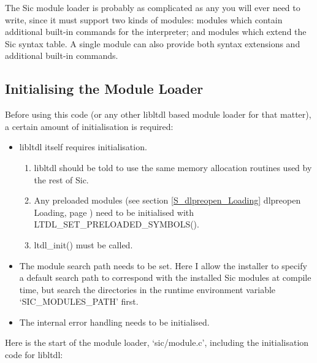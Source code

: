 The Sic module loader is probably as complicated as any you will ever need to write, since it must support two kinds of modules: modules which contain additional built-in commands for the interpreter; and modules which extend the Sic syntax table. A single module can also provide both syntax extensions and additional built-in commands.

\subsection{Initialising the Module Loader}

Before using this code (or any other libltdl based module loader for that matter), a certain amount of initialisation is required:

\begin{itemize}
    \item libltdl itself requires initialisation.

\begin{enumerate}
\item libltdl should be told to use the same memory allocation routines used by the rest of Sic.

\item Any preloaded modules (see section \ref{S_dlpreopen_Loading}
dlpreopen Loading, page \pageref{S_dlpreopen_Loading}) need to be initialised 
with LTDL\_{}SET\_{}PRELOADED\_{}SYMBOLS().

         \item ltdl\_{}init() must be called. 
\end{enumerate}

    \item The module search path needs to be set. Here I allow the installer to specify a default search path to correspond with the installed Sic modules at compile time, but search the directories in the runtime environment variable `SIC\_{}MODULES\_{}PATH' first.

    \item The internal error handling needs to be initialised. 
\end{itemize}

Here is the start of the module loader, `sic/module.c', including the initialisation code for libltdl:

